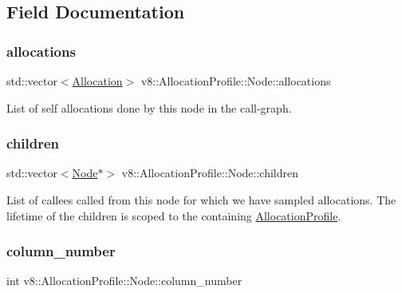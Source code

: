 \subsection{Field Documentation}
\mbox{\label{structv8_1_1AllocationProfile_1_1Node_a6ee0934b35ba77fb5d8b53f02d5a3068}} 
\subsubsection{\texorpdfstring{allocations}{allocations}}
{\footnotesize\ttfamily std\+::vector$<$\mbox{\hyperlink{structv8_1_1AllocationProfile_1_1Allocation}{Allocation}}$>$ v8\+::\+Allocation\+Profile\+::\+Node\+::allocations}

List of self allocations done by this node in the call-\/graph. \mbox{\label{structv8_1_1AllocationProfile_1_1Node_a176673c0440cb1baaf7713e14da84db0}} 
\subsubsection{\texorpdfstring{children}{children}}
{\footnotesize\ttfamily std\+::vector$<$\mbox{\hyperlink{structv8_1_1AllocationProfile_1_1Node}{Node}}$\ast$$>$ v8\+::\+Allocation\+Profile\+::\+Node\+::children}

List of callees called from this node for which we have sampled allocations. The lifetime of the children is scoped to the containing \mbox{\hyperlink{classv8_1_1AllocationProfile}{Allocation\+Profile}}. \mbox{\label{structv8_1_1AllocationProfile_1_1Node_a7cf86acc298428c858673fc1f9dbe305}} 
\subsubsection{\texorpdfstring{column\+\_\+number}{column\_number}}
{\footnotesize\ttfamily int v8\+::\+Allocation\+Profile\+::\+Node\+::column\+\_\+number}

